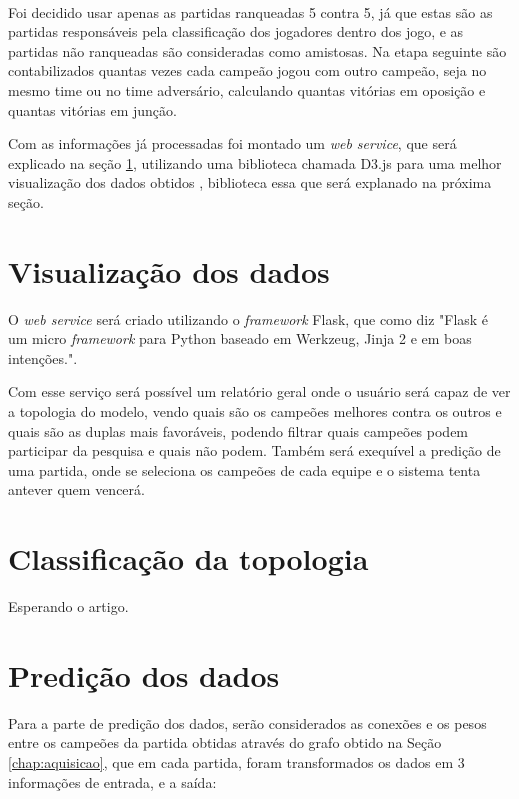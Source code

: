 \

Foi decidido usar apenas as partidas ranqueadas 5 contra 5, já que estas são as partidas responsáveis pela classificação dos jogadores dentro dos jogo, e as partidas não ranqueadas são consideradas como amistosas.
Na etapa seguinte são contabilizados quantas vezes cada campeão jogou com outro campeão, seja no mesmo time ou no time adversário, calculando quantas vitórias em oposição e quantas vitórias em junção.

Com as informações já processadas foi montado um \textit{web service}, que será explicado na seção \ref{chap:web}, utilizando uma biblioteca chamada D3.js para uma melhor visualização dos dados obtidos , biblioteca essa que será explanado na próxima seção.

\section{Visualização dos dados}
\label{chap:web}

O \textit{web service} será criado utilizando o \textit{framework} Flask, que como \citet[tradução do autor]{flask} diz "Flask é um micro \textit{framework} para Python baseado em Werkzeug, Jinja 2 e em boas intenções.".

Com esse serviço será possível um relatório geral onde o usuário será capaz de ver a topologia do modelo, vendo quais são os campeões melhores contra os outros e quais são as duplas mais favoráveis, podendo filtrar quais campeões podem participar da pesquisa e quais não podem. 
Também será exequível a predição de uma partida, onde se seleciona os campeões de cada equipe e o sistema tenta antever quem vencerá.



\section{Classificação da topologia}
\label{chap:topo}
Esperando o artigo.

\section{Predição dos dados}
\label{chap:pred}

Para a parte de predição dos dados, serão considerados as conexões e os pesos entre os campeões da partida obtidas através do grafo obtido na Seção \ref{chap:aquisicao}, que em cada partida, foram transformados os dados em 3 informações de entrada, e a saída:

